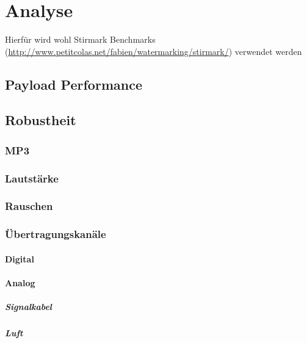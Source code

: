 \chapter{Analyse}
\label{ch:analyse}

Hierfür wird wohl Stirmark Benchmarks\cite{petitcolas2000watermarking}\cite{petitcolas2004stirmark} (\url{http://www.petitcolas.net/fabien/watermarking/stirmark/}) verwendet werden

\section{Payload Performance}
\label{sec:payloadperformance}

\section{Robustheit}

\subsection{MP3}

\subsection{Lautstärke}

\subsection{Rauschen}

\subsection{Übertragungskanäle}

\subsubsection{Digital}

\subsubsection{Analog}

\paragraph{Signalkabel}

\paragraph{Luft}






